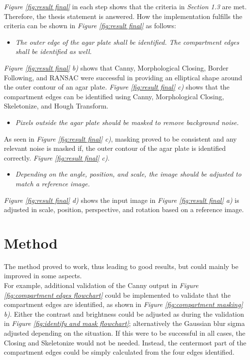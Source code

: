 \noindent \textit{Figure \ref{fig:result final}} in each step shows that the criteria in \textit{Section 1.3} are met. Therefore, the thesis statement is answered. How the implementation fulfills the criteria can be shown in \textit{Figure \ref{fig:result final}} as follows: 
 \begin{itemize}
     \item \textit{The outer edge of the agar plate shall be identified. The compartment edges shall be identified as well.}
 \end{itemize}
\textit{Figure \ref{fig:result final} b)} shows that Canny, Morphological Closing, Border Following, and RANSAC were successful in providing an elliptical shape around the outer contour of an agar plate. \textit{Figure \ref{fig:result final} c)} shows that the compartment edges can be identified using Canny, Morphological Closing, Skeletonize, and Hough Transform. 
  \begin{itemize}
     \item \textit{Pixels outside the agar plate should be masked to remove background noise.}
 \end{itemize}
 As seen in \textit{Figure \ref{fig:result final} c)}, masking proved to be consistent and any relevant noise is masked if, the outer contour of the agar plate is identified correctly.
 \textit{Figure \ref{fig:result final} c)}. 
  \begin{itemize}
     \item \textit{Depending on the angle, position, and scale, the image should be adjusted to match a reference image.}
 \end{itemize}
 \textit{Figure \ref{fig:result final} d)} shows the input image in \textit{Figure \ref{fig:result final} a)} is adjusted in scale, position, perspective, and rotation based on a reference image.


\section{Method}
\label{sec:discussion-method}

The method proved to work, thus leading to good results, but could mainly be improved in some aspects. \\

\noindent For example, additional validation of the Canny output in \textit{Figure \ref{fig:compartment edges flowchart}} could be implemented to validate that the compartment edges are identified, as shown in \textit{Figure \ref{fig:compartment masking} b)}. Either the contrast and brightness could be adjusted as during the validation in \textit{Figure \ref{fig:identify and mask flowchart}}; alternatively the Gaussian blur sigma adjusted depending on the situation. If this were to be successful in all cases, the Closing and Skeletonize would not be needed. Instead, the centermost part of the compartment edges could be simply calculated from the four edges identified. \\

